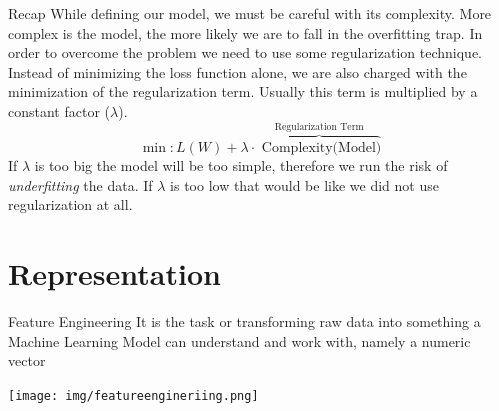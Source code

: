 \documentclass{beamer}
\begin{document}
\begin{frame}{Recap}
While defining our model, we must be careful with its complexity.
\vskip 0.2cm
\pause
More complex is the model, the more likely we are to fall in the overfitting
trap.
\vskip 0.2cm
In order to overcome the problem we need to use some regularization technique.
\pause 
\vskip 0.2cm
Instead of minimizing the loss function alone, we are also charged with the 
minimization of the regularization term. Usually this term is multiplied 
by a constant factor ($\lambda$).
\[
\min: L(W) + \lambda \cdot \overbrace{\text{ Complexity(Model)}}^{\text{Regularization Term}}\]
\pause
If $\lambda$ is too big the model will be too simple, therefore
we run the risk of \textit{underfitting} the data.
If $\lambda$ is too low that would be like we did not use regularization at all.
\end{frame}

\section{Representation}
\begin{frame}
\tableofcontents[currentsection]
\end{frame}


\begin{frame}{Feature Engineering}
It is the task or transforming raw data into something a Machine Learning Model can understand
and work with, namely a numeric vector
\vskip 0.4cm
\begin{center}
\texttt{[image: img/featureengineriing.png]}
\end{center}
\end{frame}
\end{document}
